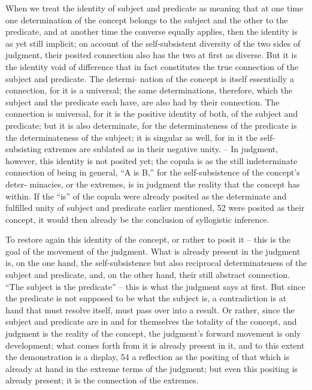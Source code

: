 When we treat the identity of subject and predicate as meaning that at
one time one determination of the concept belongs to the subject and the
other to the predicate, and at another time the converse equally applies,
then the identity is as yet still implicit; on account of the self-subsistent
diversity of the two sides of judgment, their posited connection also has
the two at first as diverse. But it is the identity void of difference that in fact
constitutes the true connection of the subject and predicate. The determi-
nation of the concept is itself essentially a connection, for it is a universal; the
same determinations, therefore, which the subject and the predicate each
have, are also had by their connection. The connection is universal, for it
is the positive identity of both, of the subject and predicate; but it is also
determinate, for the determinateness of the predicate is the determinateness
of the subject; it is singular as well, for in it the self-subsisting extremes are
sublated as in their negative unity. – In judgment, however, this identity
is not posited yet; the copula is as the still indeterminate connection of
being in general, “A is B,” for the self-subsistence of the concept’s deter-
minacies, or the extremes, is in judgment the reality that the concept has
within. If the “is” of the copula were already posited as the determinate
and fulfilled unity of subject and predicate earlier mentioned, 52 were
posited as their concept, it would then already be the conclusion of syllogistic
inference.

To restore again this identity of the concept, or rather to posit it – this
is the goal of the movement of the judgment. What is already present in
the judgment is, on the one hand, the self-subsistence but also reciprocal
determinateness of the subject and predicate, and, on the other hand,
their still abstract connection. “The subject is the predicate” – this is what
the judgment says at first. But since the predicate is not supposed to be
what the subject is, a contradiction is at hand that must resolve itself, must
pass over into a result. Or rather, since the subject and predicate are in
and for themselves the totality of the concept, and judgment is the reality
of the concept, the judgment’s forward movement is only development;
what comes forth from it is already present in it, and to this extent the
demonstration is a display, 54 a reflection as the positing of that which is already
at hand in the extreme terms of the judgment; but even this positing is
already present; it is the connection of the extremes.

